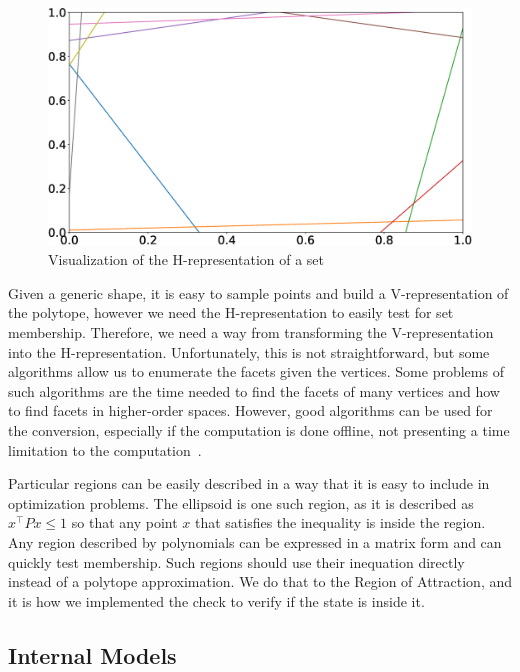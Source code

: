 \begin{figure}[!htb]
  \centering
  \includegraphics[width=\linewidth]{imgs/h-rep}
  \caption{Visualization of the H-representation of a set}%
  \label{fig:h-rep-example}
\end{figure}

Given a generic shape, it is easy to sample points and build a V-representation
of the polytope, however we need the H-representation to easily test for set
membership. Therefore, we need a way from transforming the V-representation into
the H-representation. Unfortunately, this is not straightforward, but some
algorithms allow us to enumerate the facets given the vertices. Some problems of
such algorithms are the time needed to find the facets of many vertices and how
to find facets in higher-order spaces. However, good algorithms can be used for
the conversion, especially if the computation is done offline, not presenting a
time limitation to the
computation~\parencite{avis.bremner.ea:how,graham.frances-yao:finding,lee:on,mccallum.avis:linear}.

Particular regions can be easily described in a way that it is easy to include
in optimization problems. The ellipsoid is one such region, as it is described
as \(x^{\top}Px\leq{}1\) so that any point \(x\) that satisfies the inequality is
inside the region. Any region described by polynomials can be expressed in a
matrix form and can quickly test membership. Such regions should use their
inequation directly instead of a polytope approximation. We do that to the
Region of Attraction, and it is how we implemented the check to verify if the
state is inside it.

\subsection{Internal Models}%
\label{subsec:internal-models}

